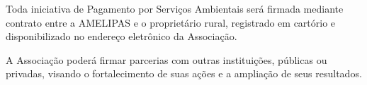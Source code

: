 \documentclass[12pt]{article}
\newcommand{\capitulo}[1]{\vspace{1.0em}\begin{center}\fontseries{b}\selectfont\textbf{\MakeUppercase{#1}}\end{center}}
\newcommand{\artigo}[1]{\vspace{1.0em}\noindent\textbf{#1}\hspace{0.75em}}
\newcommand{\paragrafo}[1]{\vspace{1.0em}\noindent{#1}\hspace{0.75em}}
\begin{document}
\paragrafo{§ 2º} Toda iniciativa de Pagamento por Serviços Ambientais será firmada mediante contrato entre a AMELIPAS e o proprietário rural, registrado em cartório e disponibilizado no endereço eletrônico da Associação.


\paragrafo{§ 3º} A Associação poderá firmar parcerias com outras instituições, públicas ou privadas, visando o fortalecimento de suas ações e a ampliação de seus resultados.






\end{document}
